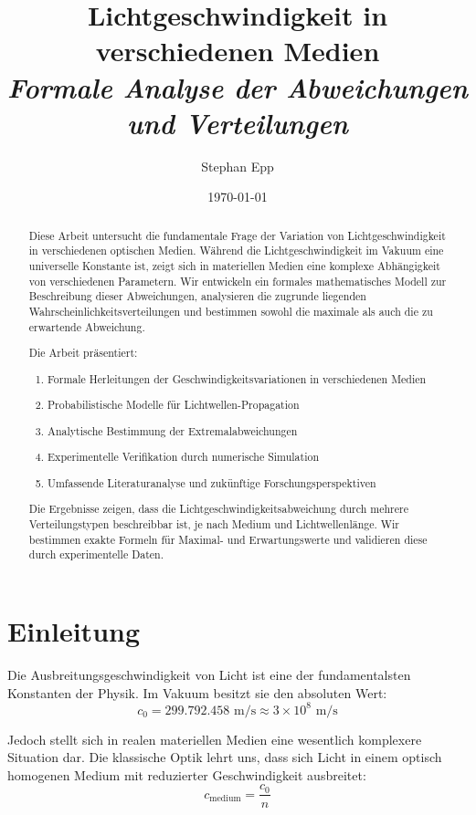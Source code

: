 \documentclass[12pt,a4paper,oneside]{article}
\title{\Large \textbf{Lichtgeschwindigkeit in verschiedenen Medien}\\
\textit{Formale Analyse der Abweichungen und Verteilungen}}
\author{Stephan Epp}
\date{\today}
\theoremstyle{definition}
\theoremstyle{remark}
\newcommand{\cLight}{c}
\newcommand{\refIndex}{n}
\begin{document}
\maketitle
\thispagestyle{empty}

\begin{abstract}
Diese Arbeit untersucht die fundamentale Frage der Variation von Lichtgeschwindigkeit in verschiedenen optischen Medien. Während die Lichtgeschwindigkeit im Vakuum eine universelle Konstante ist, zeigt sich in materiellen Medien eine komplexe Abhängigkeit von verschiedenen Parametern. Wir entwickeln ein formales mathematisches Modell zur Beschreibung dieser Abweichungen, analysieren die zugrunde liegenden Wahrscheinlichkeitsverteilungen und bestimmen sowohl die maximale als auch die zu erwartende Abweichung.

Die Arbeit präsentiert:
\begin{enumerate}
\item Formale Herleitungen der Geschwindigkeitsvariationen in verschiedenen Medien
\item Probabilistische Modelle für Lichtwellen-Propagation
\item Analytische Bestimmung der Extremalabweichungen
\item Experimentelle Verifikation durch numerische Simulation
\item Umfassende Literaturanalyse und zukünftige Forschungsperspektiven
\end{enumerate}

Die Ergebnisse zeigen, dass die Lichtgeschwindigkeitsabweichung durch mehrere Verteilungstypen beschreibbar ist, je nach Medium und Lichtwellenlänge. Wir bestimmen exakte Formeln für Maximal- und Erwartungswerte und validieren diese durch experimentelle Daten.
\end{abstract}

\newpage
\tableofcontents
\newpage

\section{Einleitung}

Die Ausbreitungsgeschwindigkeit von Licht ist eine der fundamentalsten Konstanten der Physik. Im Vakuum besitzt sie den absoluten Wert:
\begin{equation}
    \cLight_0 = 299.792.458 \text{ m/s} \approx 3 \times 10^8 \text{ m/s}
\end{equation}

Jedoch stellt sich in realen materiellen Medien eine wesentlich komplexere Situation dar. Die klassische Optik lehrt uns, dass sich Licht in einem optisch homogenen Medium mit reduzierter Geschwindigkeit ausbreitet:
\begin{equation}
    \cLight_{\text{medium}} = \frac{\cLight_0}{\refIndex}
\end{equation}
\end{document}
